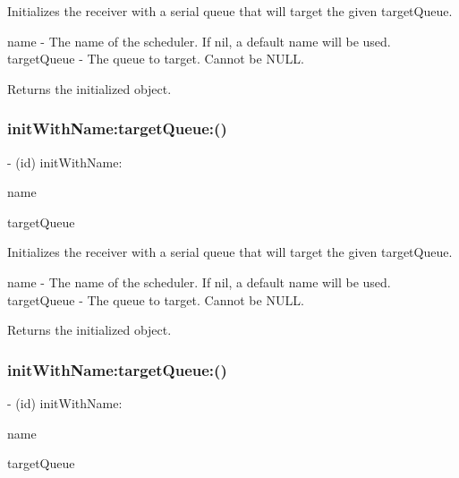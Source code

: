 Initializes the receiver with a serial queue that will target the given {\ttfamily target\+Queue}.

name -\/ The name of the scheduler. If nil, a default name will be used. target\+Queue -\/ The queue to target. Cannot be N\+U\+LL.

Returns the initialized object. \mbox{\label{interface_r_a_c_target_queue_scheduler_af25ace578b4f013b27d616460b1a16ad}} 
\subsubsection{\texorpdfstring{init\+With\+Name\+:target\+Queue\+:()}{initWithName:targetQueue:()}\hspace{0.1cm}{\footnotesize\ttfamily [2/3]}}
{\footnotesize\ttfamily -\/ (id) init\+With\+Name\+: \begin{DoxyParamCaption}\item[{(N\+S\+String $\ast$)}]{name }\item[{targetQueue:(dispatch\+\_\+queue\+\_\+t)}]{target\+Queue }\end{DoxyParamCaption}}

Initializes the receiver with a serial queue that will target the given {\ttfamily target\+Queue}.

name -\/ The name of the scheduler. If nil, a default name will be used. target\+Queue -\/ The queue to target. Cannot be N\+U\+LL.

Returns the initialized object. \mbox{\label{interface_r_a_c_target_queue_scheduler_af25ace578b4f013b27d616460b1a16ad}} 
\subsubsection{\texorpdfstring{init\+With\+Name\+:target\+Queue\+:()}{initWithName:targetQueue:()}\hspace{0.1cm}{\footnotesize\ttfamily [3/3]}}
{\footnotesize\ttfamily -\/ (id) init\+With\+Name\+: \begin{DoxyParamCaption}\item[{(N\+S\+String $\ast$)}]{name }\item[{targetQueue:(dispatch\+\_\+queue\+\_\+t)}]{target\+Queue }\end{DoxyParamCaption}}

